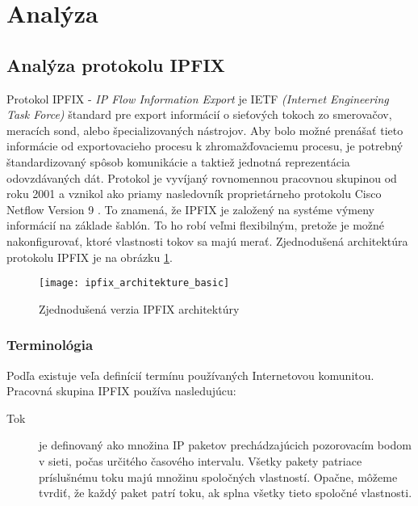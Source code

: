 \section{Anal\'yza}

\subsection{Anal\'yza protokolu IPFIX}

Protokol IPFIX - \emph{IP Flow Information Export} je IETF \emph{(Internet Engineering Task Force)}
štandard pre export informácií o sieťových tokoch zo smerovačov, meracích sond, 
alebo špecializovaných nástrojov. 
Aby bolo možné prenášať tieto informácie 
od exportovacieho procesu k zhromažďovaciemu procesu, je potrebný štandardizovaný 
spôsob komunikácie a taktiež jednotná reprezentácia odovzdávaných dát.
Protokol je vyvíjaný rovnomennou pracovnou skupinou \citep{ipfixCharter} od roku 2001 a 
vznikol ako priamy nasledovník proprietárneho protokolu Cisco Netflow Version 9 \citep{rfc3954}. 
To znamená, že IPFIX je založený na systéme výmeny informácií na základe šablón. To ho robí veľmi
flexibilným, pretože je možné nakonfigurovať, ktoré vlastnosti tokov sa majú merať.
Zjednodušená architektúra protokolu IPFIX je na obrázku \ref{o:ipfix_architekture_basic}. 
\citep{rfc5101, ipfixProtocol, juvhaugen, veri}

\begin{figure}[ht!]
\centering
\texttt{[image: ipfix\_architekture\_basic]}
\caption{Zjednodušená verzia IPFIX architektúry}\label{o:ipfix_architekture_basic}
\end{figure}

\subsubsection{Terminológia} \label{sec:ipfix_terminology}

Podľa \citep{rfc3917} existuje veľa definícií termínu  používaných Internetovou komunitou.
Pracovná skupina IPFIX používa nasledujúcu:
\begin{description}
  \item[Tok] je definovaný ako množina IP paketov prechádzajúcich pozorovacím bodom v sieti, počas určitého 
časového intervalu. Všetky pakety patriace príslušnému toku majú množinu spoločných vlastností. Opačne, 
môžeme tvrdiť, že každý paket patrí toku, ak splna všetky tieto spoločné vlastnosti. 
\end{description}

